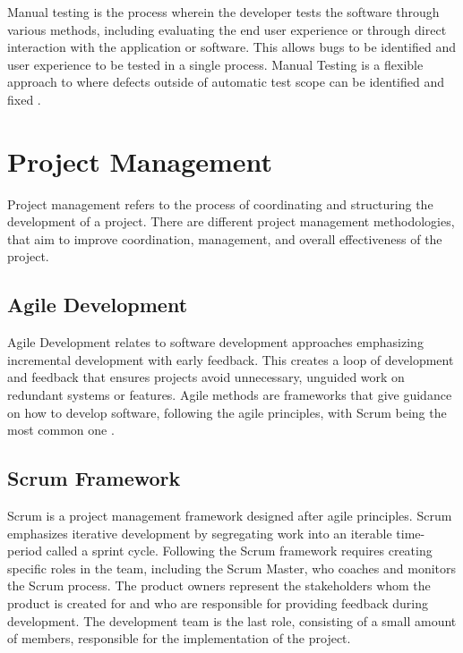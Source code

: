 Manual testing is the process wherein the developer tests the software through various methods, including evaluating the end user experience or through direct interaction with the application or software. This allows bugs to be identified and user experience to be tested in a single process. Manual Testing is a flexible approach to where defects outside of automatic test scope can be identified and fixed \parencite{ibm_software_testing}.


\section{Project Management}
\label{sec:project_management_theory}

Project management refers to the process of coordinating and structuring the development of a project. There are different project management methodologies, that aim to improve coordination, management, and overall effectiveness of the project.


\subsection{Agile Development}
\label{sec:agile_dev_theory}

Agile Development relates to software development approaches emphasizing incremental development with early feedback. This creates a loop of development and feedback that ensures projects avoid unnecessary, unguided work on redundant systems or features. Agile methods are frameworks that give guidance on how to develop software, following the agile principles, with Scrum being the most common one \parencite{agile_microsoft}.


\subsection{Scrum Framework}
\label{sec:scrum_framework_theory}

Scrum is a project management framework designed after agile principles. Scrum emphasizes iterative development by segregating work into an iterable time-period called a sprint cycle. Following the Scrum framework requires creating specific roles in the team, including the Scrum Master, who coaches and monitors the Scrum process. The product owners represent the stakeholders whom the product is created for and who are responsible for providing feedback during development. The development team is the last role, consisting of a small amount of members, responsible for the implementation of the project.

